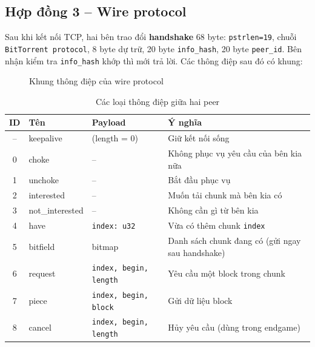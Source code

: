 \documentclass[12pt,a4paper,oneside]{report}
\begin{document}
\subsection{Hợp đồng 3 -- Wire protocol}
Sau khi kết nối TCP, hai bên trao đổi \textbf{handshake} 68 byte: \texttt{pstrlen=19}, chuỗi \texttt{{}BitTorrent protocol{}}, 8 byte dự trữ, 20 byte \texttt{info\_hash}, 20 byte \texttt{peer\_id}. Bên nhận kiểm tra \texttt{info\_hash} khớp thì mới trả lời. Các thông điệp sau đó có khung:

\begin{figure}[H]
\centering
{}
\caption{Khung thông điệp của wire protocol}
\end{figure}

\begin{table}[H]
\centering
\caption{Các loại thông điệp giữa hai peer}
\begin{tabularx}{\textwidth}{@{}clp{4.3cm}L@{}}
\toprule
\textbf{ID} & \textbf{Tên} & \textbf{Payload} & \textbf{Ý nghĩa}\\\midrule
-- & keepalive & (length = 0) & Giữ kết nối sống\\
0 & choke & -- & Không phục vụ yêu cầu của bên kia nữa\\
1 & unchoke & -- & Bắt đầu phục vụ\\
2 & interested & -- & Muốn tải chunk mà bên kia có\\
3 & not\_interested & -- & Không cần gì từ bên kia\\
4 & have & \texttt{index: u32} & Vừa có thêm chunk \texttt{index}\\
5 & bitfield & bitmap & Danh sách chunk đang có (gửi ngay sau handshake)\\
6 & request & \texttt{index, begin, length} & Yêu cầu một block trong chunk\\
7 & piece & \texttt{index, begin, block} & Gửi dữ liệu block\\
8 & cancel & \texttt{index, begin, length} & Hủy yêu cầu (dùng trong endgame)\\
\bottomrule
\end{tabularx}
\end{table}
\end{document}
